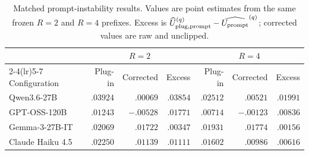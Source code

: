 \begin{table}[t]
\centering
\small
\setlength{\tabcolsep}{4.2pt}
\begin{tabular}{lrrrrrr}
\toprule
& \multicolumn{3}{c}{\(R=2\)} & \multicolumn{3}{c}{\(R=4\)} \\
\cmidrule(lr){2-4}\cmidrule(lr){5-7}
Configuration & Plug-in & Corrected & Excess &
Plug-in & Corrected & Excess \\
\midrule
Qwen3.6-27B & $.03924$ & $.00069$ & $.03854$ & $.02512$ & $.00521$ & $.01991$ \\
GPT-OSS-120B & $.01243$ & $-.00528$ & $.01771$ & $.00714$ & $-.00123$ & $.00836$ \\
Gemma-3-27B-IT & $.02069$ & $.01722$ & $.00347$ & $.01931$ & $.01774$ & $.00156$ \\
Claude Haiku 4.5 & $.02250$ & $.01139$ & $.01111$ & $.01602$ & $.00986$ & $.00616$ \\
\bottomrule
\end{tabular}
\caption{Matched prompt-instability results. Values are point estimates from
the same frozen \(R=2\) and \(R=4\) prefixes. Excess is
\(\widehat U_{\rm plug,prompt}^{(q)}-\widehat{U_{\mathrm{prompt}}}^{(q)}\); corrected values are
raw and unclipped.}
\label{tab:s-cross-prompt}
\end{table}
